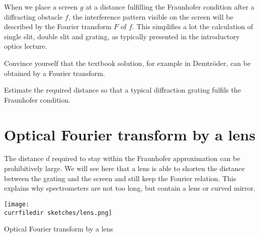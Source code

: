 When we place a screen $g$ at a distance fulfilling the Fraunhofer condition after a diffracting obstacle $f$, the interference pattern visible on the screen will be described by the Fourier transform $F$ of $f$. This simplifies a lot the calculation of single slit, double slit and grating, as typically  presented in the  introductory optics lecture.

\begin{questions}
    \item Convince yourself that the textbook solution, for example in Demtröder, can be obtained by a Fourier transform.
    \item Estimate the required distance so that a typical diffraction grating fulfils the Fraunhofer condition.
\end{questions}


\section{Optical Fourier transform by a lens}

The distance $d$ required to stay within the Fraunhofer approximation can be prohibitively large. We will see here that a lens is able to shorten the distance between the grating and the screen and still keep the Fourier relation. This explains why spectrometers are not too long, but contain a lens or curved mirror.

\begin{marginfigure}
    \texttt{[image: \\currfiledir sketches/lens.png]}
    \caption{Optical Fourier transform by a lens}
\end{marginfigure}

